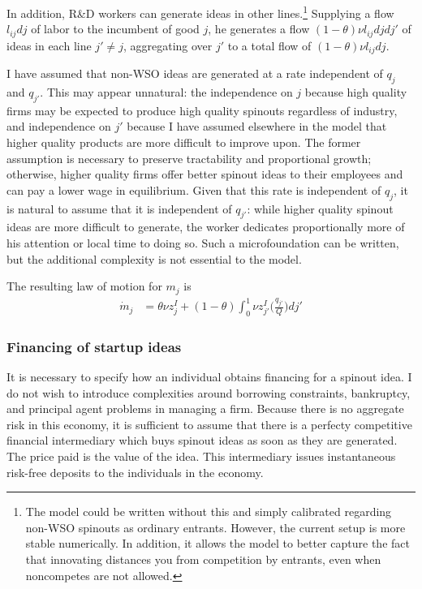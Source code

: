 \documentclass[12pt,english]{article}
\theoremstyle{remark}
\begin{document}
In addition, R\&D workers can generate ideas in other lines.\footnote{The model could be written without this and simply calibrated regarding non-WSO spinouts as ordinary entrants. However, the current setup is more stable numerically. In addition, it allows the model to better capture the fact that innovating distances you from competition by entrants, even when noncompetes are not allowed.} Supplying a flow $l_{ij}dj$ of labor to the incumbent of good $j$, he generates a flow $(1-\theta)\nu l_{ij} dj dj'$ of ideas in each line $j' \ne j$, aggregating over $j'$ to a total flow of $(1-\theta) \nu l_{ij} dj$.

I have assumed that non-WSO ideas are generated at a rate independent of $q_j$ and $q_{j'}$. This may appear unnatural: the independence on $j$ because high quality firms may be expected to produce high quality spinouts regardless of industry, and independence on $j'$ because I have assumed elsewhere in the model that higher quality products are more difficult to improve upon. The former assumption is necessary to preserve tractability and proportional growth; otherwise, higher quality firms offer better spinout ideas to their employees and can pay a lower wage in equilibrium. Given that this rate is independent of $q_j$, it is natural to assume that it is independent of $q_{j'}$: while higher quality spinout ideas are more difficult to generate, the worker dedicates proportionally more of his attention or local time to doing so. Such a microfoundation can be written, but the additional complexity is not essential to the model. 

The resulting law of motion for $m_j$ is 
\begin{align}
\dot{m}_j &= \theta \nu z^I_j + (1-\theta) \int_0^1 \nu z^I_{j'} \Big(\frac{q_{j'}}{Q} \Big)dj' \label{m_law_of_motion}
\end{align}

\subsubsection{Financing of startup ideas}

It is necessary to specify how an individual obtains financing for a spinout idea. I do not wish to introduce complexities around borrowing constraints, bankruptcy, and principal agent problems in managing a firm. Because there is no aggregate risk in this economy, it is sufficient to assume that there is a perfecty competitive financial intermediary which buys spinout ideas as soon as they are generated. The price paid is the value of the idea. This intermediary issues instantaneous risk-free deposits to the individuals in the economy.
\end{document}
